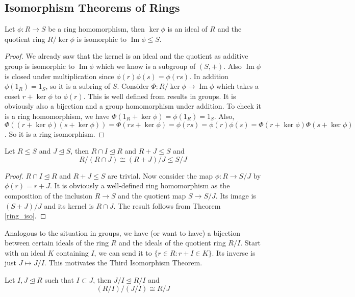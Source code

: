 \subsection{Isomorphism Theorems of Rings}
\begin{theorem}\label{ring_iso}
    Let $\phi:R\to S$ be a ring homomorphism, then $\ker\phi$ is an ideal of $R$ and the quotient ring $R/\ker\phi$ is isomorphic to $\operatorname{Im}\phi\le S$.
\end{theorem}
\begin{proof}
    We already saw that the kernel is an ideal and the quotient as additive group is isomorphic to $\operatorname{Im}\phi$ which we know is a subgroup of $(S,+)$.
    Also $\operatorname{Im}\phi$ is closed under multiplication since $\phi(r)\phi(s)=\phi(rs)$.
    In addition $\phi(1_R)=1_S$, so it is a subring of $S$.
    Consider $\Phi:R/\ker\phi\to\operatorname{Im}\phi$ which takes a coset $r+\ker\phi$ to $\phi(r)$.
    This is well defined from results in groups.
    It is obviously also a bijection and a group homomorphism under addition.
    To check it is a ring homomorphism, we have $\Phi(1_R+\ker\phi)=\phi(1_R)=1_S$.
    Also, $\Phi((r+\ker\phi)(s+\ker\phi))=\Phi(rs+\ker\phi)=\phi(rs)=\phi(r)\phi(s)=\Phi(r+\ker\phi)\Phi(s+\ker\phi)$.
    So it is a ring isomorphism.
\end{proof}
\begin{corollary}
    Let $R\le S$ and $J\unlhd S$, then $R\cap I\unlhd R$ and $R+J\le S$ and
    $$R/(R\cap J)\cong (R+J)/J\le S/J$$
\end{corollary}
\begin{proof}
    $R\cap I\unlhd R$ and $R+J\le S$ are trivial.
    Now consider the map $\phi:R\to S/J$ by $\phi(r)=r+J$.
    It is obviously a well-defined ring homomorphism as the composition of the inclusion $R\to S$ and the quotient map $S\to S/J$.
    Its image is $(S+J)/J$ and its kernel is $R\cap J$.
    The result follows from Theorem \ref{ring_iso}.
\end{proof}
Analogous to the situation in groups, we have (or want to have) a bijection between certain ideals of the ring $R$ and the ideals of the quotient ring $R/I$.
Start with an ideal $K$ containing $I$, we can send it to $\{r\in R:r+I\in K\}$.
Its inverse is just $J\mapsto J/I$.
This motivates the Third Isomorphism Theorem.
\begin{corollary}
    Let $I,J\unlhd R$ such that $I\subset J$, then $J/I\unlhd R/I$ and
    $$(R/I)/(J/I)\cong R/J$$
\end{corollary}
